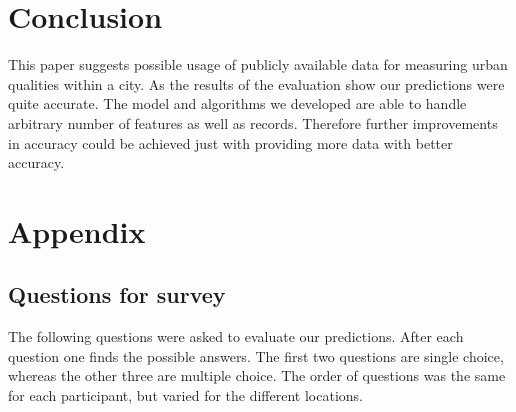 \documentclass[letterpaper]{article}
\begin{document}
\section{Conclusion}
This paper suggests possible usage of publicly available data for measuring urban qualities within a city.
As the results of the evaluation show our predictions were quite accurate. The model and algorithms we developed
are able to handle arbitrary number of features as well as records. Therefore further improvements in accuracy
could be achieved just with providing more data with better accuracy.




\newpage
\section{Appendix}
\subsection{Questions for survey}\label{app:questions}
The following questions were asked to evaluate our predictions. After each question one finds the possible answers.
The first two questions are single choice, whereas the other three are multiple choice.
The order of questions was the same for each participant, but varied for the different locations.
\end{document}
